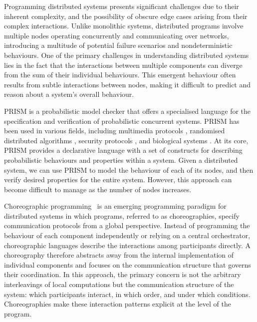 Programming distributed systems
presents significant challenges due to their inherent complexity, and
the possibility of obscure edge cases arising from their complex
interactions.
Unlike monolithic systems, distributed programs involve multiple nodes
operating concurrently and communicating over networks, introducing a
multitude of potential failure scenarios and nondeterministic
behaviours.
One of the primary challenges in understanding distributed systems
lies in the fact that the interactions between multiple components can
diverge from the sum of their individual behaviours. This emergent
behaviour often results from subtle interactions between nodes, making
it difficult to predict and reason about a system's overall behaviour.

PRISM \cite{PRISMdoc} is a probabilistic model checker that offers a
specialised language for the specification and verification of
probabilistic concurrent systems. PRISM has been used in various
fields, including multimedia protocols \cite{multimedia}, randomised
distributed algorithms \cite{distr1,distr2}, security protocols
\cite{security1,security2}, and biological systems \cite{bio1,bio2}.
At its core, PRISM provides a declarative language with a set of
constructs for describing probabilistic behaviours and properties
within a system.
Given a distributed system, we can use PRISM to model the behaviour of
each of its nodes,
and then verify desired properties for the entire system. However,
this approach can become difficult to manage as the number of nodes
increases.


Choreographic programming~\cite{M23} is an emerging programming
paradigm for distributed systems in which programs, referred to as
choreographies, specify communication protocols from a global
perspective. Instead of programming the behaviour of each component
independently or relying on a central orchestrator, choreographic
languages describe the interactions among participants directly. A
choreography therefore abstracts away from the internal implementation
of individual components and focuses on the communication structure
that governs their coordination.
In this approach, the primary concern is not the arbitrary
interleavings of local computations but the communication structure of
the system: which participants interact, in which order, and under
which conditions. Choreographies make these interaction patterns
explicit at the level of the program.



